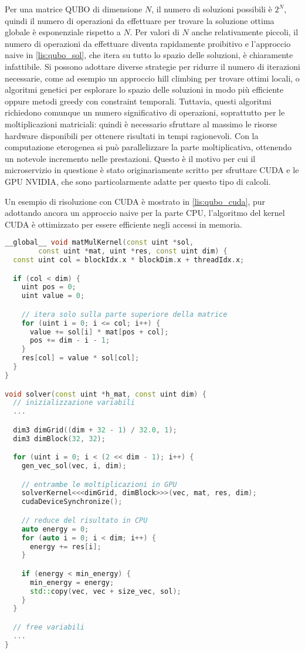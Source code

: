 Per una matrice QUBO di dimensione $N$, il numero di soluzioni possibili è $2^N$, quindi il numero di operazioni da effettuare per trovare la soluzione ottima globale è esponenziale rispetto a $N$. Per valori di $N$ anche relativamente piccoli, il numero di operazioni da effettuare diventa rapidamente proibitivo e l'approccio naive in \ref{lis:qubo_sol}, che itera su tutto lo spazio delle soluzioni, è chiaramente infattibile. 
Si possono adottare diverse strategie per ridurre il numero di iterazioni necessarie, come ad esempio un approccio hill climbing per trovare ottimi locali, o algoritmi genetici per esplorare lo spazio delle soluzioni in modo più efficiente oppure metodi greedy con constraint temporali. Tuttavia, questi algoritmi richiedono comunque un numero significativo di operazioni, soprattutto per le moltiplicazioni matriciali: quindi è necessario sfruttare al massimo le risorse hardware disponibili per ottenere risultati in tempi ragionevoli. Con la computazione eterogenea si può parallelizzare la parte moltiplicativa, ottenendo un notevole incremento nelle prestazioni. Questo è il motivo per cui il microservizio in questione è stato originariamente scritto per sfruttare CUDA e le GPU NVIDIA, che sono particolarmente adatte per questo tipo di calcoli.

Un esempio di risoluzione con CUDA è mostrato in \ref{lis:qubo_cuda}, pur adottando ancora un approccio naive per la parte CPU, l'algoritmo del kernel CUDA è ottimizzato per essere efficiente negli accessi in memoria.


\vspace{5mm}
\begin{lstlisting}[language=C++, caption=CUDA moltiplicazine matrice QUBO, label=lis:qubo_cuda]
__global__ void matMulKernel(const uint *sol, 
        const uint *mat, uint *res, const uint dim) {
  const uint col = blockIdx.x * blockDim.x + threadIdx.x;

  if (col < dim) {
    uint pos = 0;
    uint value = 0;

    // itera solo sulla parte superiore della matrice
    for (uint i = 0; i <= col; i++) {
      value += sol[i] * mat[pos + col];
      pos += dim - i - 1;
    }
    res[col] = value * sol[col];
  }
}

void solver(const uint *h_mat, const uint dim) {
  // inizializzazione variabili
  ... 

  dim3 dimGrid((dim + 32 - 1) / 32.0, 1);
  dim3 dimBlock(32, 32);

  for (uint i = 0; i < (2 << dim - 1); i++) {
    gen_vec_sol(vec, i, dim);

    // entrambe le moltiplicazioni in GPU
    solverKernel<<<dimGrid, dimBlock>>>(vec, mat, res, dim);
    cudaDeviceSynchronize();

    // reduce del risultato in CPU
    auto energy = 0;
    for (auto i = 0; i < dim; i++) {
      energy += res[i];
    }

    if (energy < min_energy) {
      min_energy = energy;
      std::copy(vec, vec + size_vec, sol);
    }
  }

  // free variabili
  ...
}

\end{lstlisting}
\vspace{5mm}

